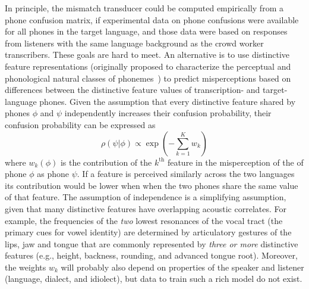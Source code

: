 In principle, the mismatch transducer could be computed empirically from
a phone confusion matrix, if experimental data on phone confusions
were available for all phones in the target language, and those data
were based on responses from listeners with the same language background
as the crowd worker transcribers. These goals are hard to meet. 
An alternative is to use distinctive feature representations
(originally proposed to characterize the perceptual and phonological
natural classes of phonemes~\cite{Jakobson52}) to predict misperceptions
based on differences between the distinctive feature values of 
transcription- and target-language phones. Given the assumption that 
every distinctive feature shared by phones $\phi$ and $\psi$ 
independently increases their confusion probability, their confusion 
probability can be expressed as
\begin{equation}
  \rho(\psi|\phi)\propto \exp\left(-\sum_{k=1}^K
  w_k\right)
  \label{eq:dfdist}
\end{equation}
where $w_k(\phi)$ is the contribution of the $k^{\textrm{th}}$ feature in the 
misperception of the of phone $\phi$ as phone $\psi$. If a feature is 
perceived similarly across the two languages its contribution would be 
lower when when the two phones share the same value of that 
feature. The assumption of independence is a simplifying assumption,
given that many distinctive features have overlapping acoustic
correlates. For example, the frequencies of the {\em two} lowest
resonances of the vocal tract (the primary cues for vowel identity) are
determined by articulatory gestures of the lips, jaw and tongue that are
commonly represented by {\em three or more} distinctive features
(e.g., height, backness, rounding, and advanced tongue root). Moreover,
the weights $w_k$ will probably also depend on properties of the speaker
and listener (language, dialect, and idiolect), but data to train such a
rich model do not exist.

